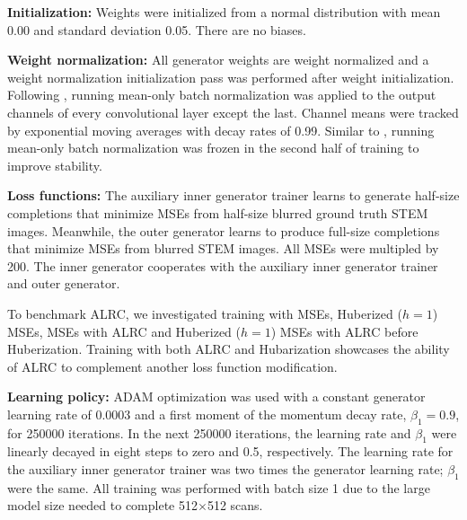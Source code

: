 \documentclass[letterpaper, 10 pt, conference]{ieeeconf}  %
\newcommand\extraspace{3pt}
\begin{document}
\vspace{\extraspace}
\noindent\textbf{Initialization:} Weights were initialized from a normal distribution with mean 0.00 and standard deviation 0.05. There are no biases.

\vspace{\extraspace}
\noindent\textbf{Weight normalization:} All generator weights are weight normalized\cite{salimans2016weight} and a weight normalization initialization pass was performed after weight initialization. Following \cite{salimans2016weight, hoffer2018norm}, running mean-only batch normalization was applied to the output channels of every convolutional layer except the last. Channel means were tracked by exponential moving averages with decay rates of 0.99. Similar to \cite{chen2017rethinking}, running mean-only batch normalization was frozen in the second half of training to improve stability.

\vspace{\extraspace}
\noindent\textbf{Loss functions:} The auxiliary inner generator trainer learns to generate half-size completions that minimize MSEs from half-size blurred ground truth STEM images. Meanwhile, the outer generator learns to produce full-size completions that minimize MSEs from blurred STEM images. All MSEs were multipled by 200. The inner generator cooperates with the auxiliary inner generator trainer and outer generator. 

To benchmark ALRC, we investigated training with MSEs, Huberized ($h=1$) MSEs, MSEs with ALRC and Huberized ($h=1$) MSEs with ALRC before Huberization. Training with both ALRC and Hubarization showcases the ability of ALRC to complement another loss function modification.

\vspace{\extraspace}
\noindent\textbf{Learning policy:} ADAM optimization\cite{kingma2014adam} was used with a constant generator learning rate of 0.0003 and a first moment of the momentum decay rate, $\beta_1=0.9$, for 250000 iterations. In the next 250000 iterations, the learning rate and $\beta_1$ were linearly decayed in eight steps to zero and 0.5, respectively. The learning rate for the auxiliary inner generator trainer was two times the generator learning rate; $\beta_1$ were the same. All training was performed with batch size 1 due to the large model size needed to complete 512$\times$512 scans.
\end{document}
